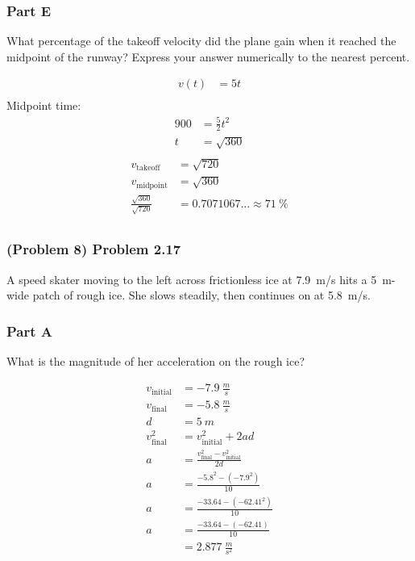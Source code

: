 \subsubsection{Part E}
What percentage of the takeoff velocity did the plane gain when it reached the midpoint of the runway? Express your answer numerically to the nearest percent.

\begin{solution}
	\begin{align*}
		v(t) &= 5t \\
	\end{align*}
	Midpoint time:
	\begin{align*}
		900 &= \frac{5}{2}t^2 \\
		t &= \sqrt{360} \\
	\end{align*}
	\begin{align*}
		v_{\mathrm{takeoff}} &= \sqrt{720} \\
		v_{\mathrm{midpoint}} &= \sqrt{360} \\
		\frac{\sqrt{360}}{\sqrt{720}} &= 0.7071067\ldots \approx \SI{71}{\percent} \\
	\end{align*}
\end{solution}

\newpage

\subsubsection{(Problem 8) Problem 2.17}
A speed skater moving to the left across frictionless ice at \SI{7.9}{m/s} hits a \SI{5}{m}-wide patch of rough ice. She slows steadily, then continues on at \SI{5.8}{m/s}.

\subsubsection{Part A}
What is the magnitude of her acceleration on the rough ice?

\begin{solution}
	\begin{align*}
		v_{\mathrm{initial}} &= \SI{-7.9}{\frac{m}{s}} \\
		v_{\mathrm{final}} &= \SI{-5.8}{\frac{m}{s}} \\
		d &= \SI{5}{m} \\
		v_{\mathrm{final}}^2 &= v_{\mathrm{initial}}^2 + 2ad \\
		a &= \frac{v_{\mathrm{final}}^2 - v_{\mathrm{initial}}^2}{2d} \\
		a &= \frac{-5.8^2- \left( -7.9^2 \right)}{10} \\
		a &= \frac{-33.64 - \left( -62.41^2 \right)}{10} \\
		a &= \frac{-33.64 - \left( -62.41 \right)}{10} \\
		&= \boxed{\SI{2.877}{\frac{m}{s^2}}}
	\end{align*}
\end{solution}

